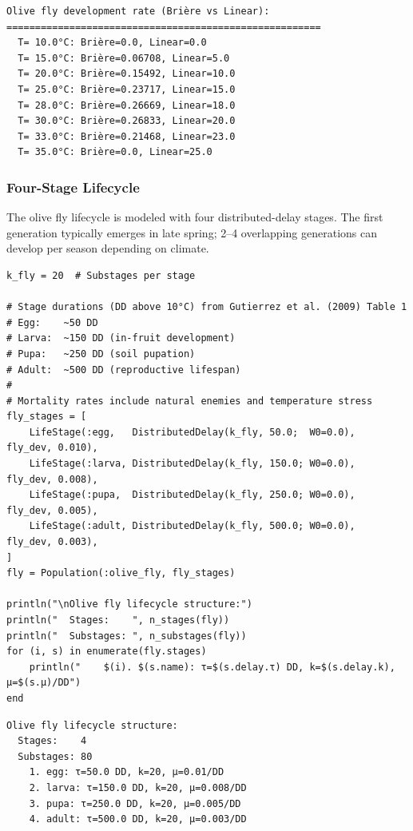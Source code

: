 \begin{verbatim}
Olive fly development rate (Brière vs Linear):
=======================================================
  T= 10.0°C: Brière=0.0, Linear=0.0
  T= 15.0°C: Brière=0.06708, Linear=5.0
  T= 20.0°C: Brière=0.15492, Linear=10.0
  T= 25.0°C: Brière=0.23717, Linear=15.0
  T= 28.0°C: Brière=0.26669, Linear=18.0
  T= 30.0°C: Brière=0.26833, Linear=20.0
  T= 33.0°C: Brière=0.21468, Linear=23.0
  T= 35.0°C: Brière=0.0, Linear=25.0
\end{verbatim}



\subsubsection{Four-Stage Lifecycle}



\label{15651674436973397724}{}


The olive fly lifecycle is modeled with four distributed-delay stages. The first generation typically emerges in late spring; 2–4 overlapping generations can develop per season depending on climate.




\begin{verbatim}
k_fly = 20  # Substages per stage

# Stage durations (DD above 10°C) from Gutierrez et al. (2009) Table 1
# Egg:    ~50 DD
# Larva:  ~150 DD (in-fruit development)
# Pupa:   ~250 DD (soil pupation)
# Adult:  ~500 DD (reproductive lifespan)
#
# Mortality rates include natural enemies and temperature stress
fly_stages = [
    LifeStage(:egg,   DistributedDelay(k_fly, 50.0;  W0=0.0),  fly_dev, 0.010),
    LifeStage(:larva, DistributedDelay(k_fly, 150.0; W0=0.0),  fly_dev, 0.008),
    LifeStage(:pupa,  DistributedDelay(k_fly, 250.0; W0=0.0),  fly_dev, 0.005),
    LifeStage(:adult, DistributedDelay(k_fly, 500.0; W0=0.0),  fly_dev, 0.003),
]
fly = Population(:olive_fly, fly_stages)

println("\nOlive fly lifecycle structure:")
println("  Stages:    ", n_stages(fly))
println("  Substages: ", n_substages(fly))
for (i, s) in enumerate(fly.stages)
    println("    $(i). $(s.name): τ=$(s.delay.τ) DD, k=$(s.delay.k), μ=$(s.μ)/DD")
end
\end{verbatim}




\begin{verbatim}
Olive fly lifecycle structure:
  Stages:    4
  Substages: 80
    1. egg: τ=50.0 DD, k=20, μ=0.01/DD
    2. larva: τ=150.0 DD, k=20, μ=0.008/DD
    3. pupa: τ=250.0 DD, k=20, μ=0.005/DD
    4. adult: τ=500.0 DD, k=20, μ=0.003/DD
\end{verbatim}



